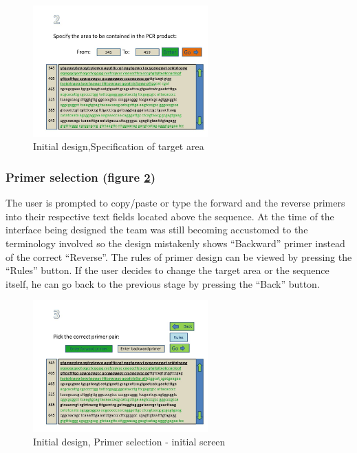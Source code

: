 \begin{figure}[h]
  \begin{center}
	\includegraphics[width=0.6\textwidth]{./images/UiDes/Slide2.JPG}
    \caption{
      \label{fig:UiDes:slide2}
      Initial design,Specification of target area
    }
  \end{center}
\end{figure}

\subsubsection{Primer selection (figure \ref{fig:UiDes:slide3})}

The user is prompted to copy/paste or type the forward and the reverse
primers into their respective text fields located above the sequence.
At the time of the interface being designed the team was still
becoming accustomed to the terminology involved so the design
mistakenly shows ``Backward'' primer instead of the correct
``Reverse''.
The rules of primer design can be viewed by pressing the ``Rules''
button.
If the user decides to change the target area or the sequence itself,
he can go back to the previous stage by pressing the ``Back'' button. 

\begin{figure}[h]
  \begin{center}
	\includegraphics[width=0.6\textwidth]{./images/UiDes/slide3.jpg}
    \caption{
      \label{fig:UiDes:slide3}
      Initial design, Primer selection - initial screen
    }
  \end{center}
\end{figure}

